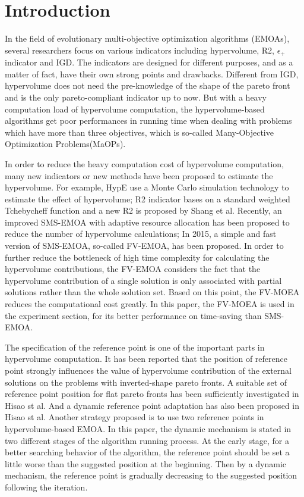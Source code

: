 \documentclass[conference]{IEEEtran}
\begin{document}
\section{Introduction}
In the field of evolutionary multi-objective optimization algorithms (EMOAs), 
several researchers focus on various indicators including hypervolume\cite{hypervolume}, R2\cite{R2}, $\epsilon_+$ indicator\cite{e+} and IGD\cite{IGD}.
The indicators are designed for different purposes, and as a matter of fact, 
have their own strong points and drawbacks. Different from IGD, 
hypervolume does not need the pre-knowledge of the shape of the pareto front 
and is the only pareto-compliant indicator up to now\cite{pareto_compliant}. 
But with a heavy computation load of hypervolume computation\cite{hypervolume:computationLoad}, 
the hypervolume-based algorithms get poor performances 
in running time when dealing with problems which have more than three objectives, 
which is so-called Many-Objective Optimization Problems(MaOPs). 

In order to reduce the heavy computation cost of hypervolume computation, 
many new indicators or new methods have been proposed to estimate the hypervolume. 
For example, HypE use a Monte Carlo simulation technology to estimate the effect of hypervolume\cite{HypE}; 
R2 indicator bases on a standard weighted Tchebycheff function\cite{R2} and a new R2 is proposed by Shang et al\cite{newR2}.
Recently, an improved SMS-EMOA with adaptive resource allocation has been proposed to reduce the number of hypervolume calculations\cite{ismsemoa}; 
In 2015, a simple and fast version of SMS-EMOA\cite{smsemoa}, so-called FV-EMOA, has been proposed\cite{FVEMOA}.
In order to further reduce the bottleneck of high time complexity for calculating the hypervolume contributions, 
the FV-EMOA considers the fact that the hypervolume contribution of a single solution 
is only associated with partial solutions rather than the whole solution set\cite{FVEMOA}. 
Based on this point, the FV-MOEA reduces the computational cost greatly. 
In this paper, the FV-MOEA is used in the experiment section, 
for its better performance on time-saving than SMS-EMOA\cite{FVEMOA}. 

The specification of the reference point is one of the important parts in hypervolume computation. 
It has been reported that the position of reference point strongly influences the value of
hypervolume contribution of the external solutions on the problems with inverted-shape pareto fronts\cite{hisao:RPhowtoSpecify, hisao:RPspecify, hisao:RPexplanation}. 
A suitable set of reference point position for flat pareto fronts has been sufficiently investigated in Hisao st al\cite{hisao:RPspecify}.
And a dynamic reference point adaptation has also been proposed in Hisao st al\cite{hisao:dynamic}.
Another strategy proposed is to use two reference points in hypervolume-based EMOA\cite{hisao:twoRP}. 
In this paper, the dynamic mechanism is stated in two different stages of the algorithm running process. 
At the early stage, for a better searching behavior of the algorithm, 
the reference point should be set a little worse than the suggested position at the beginning.
Then by a dynamic mechanism, the reference point is gradually decreasing to the suggested position following the iteration. 
\end{document}
